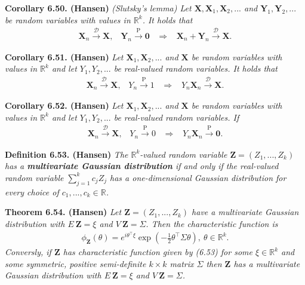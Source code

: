 \documentclass[
]{book}
\begin{document}
\textbf{Corollary 6.50. (Hansen)} \emph{(Slutsky's lemma) Let \(\mathbf{X},\mathbf{X}_1,\mathbf{X}_2,...\) and \(\mathbf{Y}_1,\mathbf{Y}_2,...\) be random variables with values in \(\mathbb{R}^k\). It holds that}
\begin{align*}
    \mathbf{X}_n\stackrel{\mathcal{D}}{\to} \mathbf{X},\hspace{10pt}\mathbf{Y}_n\stackrel{\text{P}}{\to} \mathbf{0}\hspace{10pt}\Rightarrow\hspace{10pt} \mathbf{X}_n+\mathbf{Y}_n\stackrel{\mathcal{D}}{\to}\mathbf{X}.
\end{align*}

\textbf{Corollary 6.51. (Hansen)} \emph{Let \(\mathbf{X}_1,\mathbf{X}_2,...\) and \(\mathbf{X}\) be random variables with values in \(\mathbb{R}^k\) and let \(Y_1,Y_2,...\) be real-valued random variables. It holds that}
\begin{align*}
    \mathbf{X}_n\stackrel{\mathcal{D}}{\to} \mathbf{X},\hspace{10pt}Y_n\stackrel{\text{P}}{\to} 1\hspace{10pt}\Rightarrow\hspace{10pt} Y_n\mathbf{X}_n\stackrel{\mathcal{D}}{\to}\mathbf{X}.
\end{align*}

\textbf{Corollary 6.52. (Hansen)} \emph{Let \(\mathbf{X}_1,\mathbf{X}_2,...\) and \(\mathbf{X}\) be random variables with values in \(\mathbb{R}^k\) and let \(Y_1,Y_2,...\) be real-valued random variables. If}
\begin{align*}
    \mathbf{X}_n\stackrel{\mathcal{D}}{\to} \mathbf{X},\hspace{10pt}Y_n\stackrel{\text{P}}{\to} 0\hspace{10pt}\Rightarrow\hspace{10pt} Y_n\mathbf{X}_n\stackrel{\text{P}}{\to} \mathbf{0}.
\end{align*}

\textbf{Definition 6.53. (Hansen)} \emph{The \(\mathbb{R}^k\)-valued random variable \(\mathbf{Z}=(Z_1,...,Z_k)\) has a \textbf{multivariate Gaussian distribution} if and only if the real-valued random variable \(\sum_{j=1}^kc_jZ_j\) has a one-dimensional Gaussian distribution for every choice of \(c_1,...,c_k\in\mathbb{R}\).}

\textbf{Theorem 6.54. (Hansen)} \emph{Let \(\mathbf{Z}=(Z_1,...,Z_k)\) have a multivariate Gaussian distribution with \(E\ \mathbf{Z}=\xi\) and \(V\ \mathbf{Z}=\Sigma\). Then the characteristic function is}
\begin{align*}
    \phi_\mathbf{Z}(\theta)=e^{i\theta^\top\xi}\exp\left(-\frac{1}{2}\theta^\top\Sigma\theta\right),\ \theta\in\mathbb{R}^k.\tag{6.53}
\end{align*}
\emph{Conversly, if \(\mathbf{Z}\) has characteristic function given by (6.53) for some \(\xi\in\mathbb{R}^k\) and some symmetric, positive semi-definite \(k\times k\) matrix \(\Sigma\) then \(\mathbf{Z}\) has a multivariate Gaussian distribution with \(E\ \mathbf{Z}=\xi\) and \(V\ \mathbf{Z}=\Sigma\).}
\end{document}

